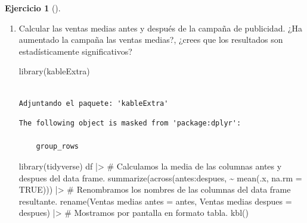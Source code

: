 \documentclass[
  a4paper,
]{scrreport}
\newenvironment{Shaded}{\begin{snugshade}}{\end{snugshade}}
\newcommand{\AttributeTok}[1]{\textcolor[rgb]{0.40,0.45,0.13}{#1}}
\newcommand{\CommentTok}[1]{\textcolor[rgb]{0.37,0.37,0.37}{#1}}
\newcommand{\ConstantTok}[1]{\textcolor[rgb]{0.56,0.35,0.01}{#1}}
\newcommand{\FunctionTok}[1]{\textcolor[rgb]{0.28,0.35,0.67}{#1}}
\newcommand{\NormalTok}[1]{\textcolor[rgb]{0.00,0.23,0.31}{#1}}
\newcommand{\OtherTok}[1]{\textcolor[rgb]{0.00,0.23,0.31}{#1}}
\newcommand{\SpecialCharTok}[1]{\textcolor[rgb]{0.37,0.37,0.37}{#1}}
\newcommand{\StringTok}[1]{\textcolor[rgb]{0.13,0.47,0.30}{#1}}
\theoremstyle{definition}
\newtheorem{exercise}{Ejercicio}[chapter]
\theoremstyle{remark}
\begin{document}
\begin{exercise}[]
\begin{enumerate}
\begin{tcolorbox}
  \end{tcolorbox}
\item
  Calcular las ventas medias antes y después de la campaña de
  publicidad. ¿Ha aumentado la campaña las ventas medias?, ¿crees que
  los resultados son estadísticamente significativos?

  \begin{tcolorbox}[enhanced jigsaw, breakable, toptitle=1mm, colbacktitle=quarto-callout-tip-color!10!white, rightrule=.15mm, opacityback=0, opacitybacktitle=0.6, titlerule=0mm, coltitle=black, colframe=quarto-callout-tip-color-frame, colback=white, bottomtitle=1mm, leftrule=.75mm, toprule=.15mm, title=\textcolor{quarto-callout-tip-color}{\faLightbulb}\hspace{0.5em}{Solución}, arc=.35mm, bottomrule=.15mm, left=2mm]

\begin{Shaded}
\begin{Highlighting}[]
\FunctionTok{library}\NormalTok{(kableExtra)}
\end{Highlighting}
\end{Shaded}

\begin{verbatim}

Adjuntando el paquete: 'kableExtra'
\end{verbatim}

\begin{verbatim}
The following object is masked from 'package:dplyr':

    group_rows
\end{verbatim}

\begin{Shaded}
\begin{Highlighting}[]
\FunctionTok{library}\NormalTok{(tidyverse)}
\NormalTok{df }\SpecialCharTok{|\textgreater{}} 
    \CommentTok{\# Calculamos la media de las columnas antes y despues del data frame.}
    \FunctionTok{summarize}\NormalTok{(}\FunctionTok{across}\NormalTok{(antes}\SpecialCharTok{:}\NormalTok{despues, }\SpecialCharTok{\textasciitilde{}} \FunctionTok{mean}\NormalTok{(.x, }\AttributeTok{na.rm =} \ConstantTok{TRUE}\NormalTok{))) }\SpecialCharTok{|\textgreater{}} 
    \CommentTok{\# Renombramos los nombres de las columnas del data frame resultante.}
    \FunctionTok{rename}\NormalTok{(}\StringTok{\textasciigrave{}}\AttributeTok{Ventas medias antes}\StringTok{\textasciigrave{}} \OtherTok{=}\NormalTok{ antes, }\StringTok{\textasciigrave{}}\AttributeTok{Ventas medias despues}\StringTok{\textasciigrave{}} \OtherTok{=}\NormalTok{ despues) }\SpecialCharTok{|\textgreater{}} 
    \CommentTok{\# Mostramos por pantalla en formato tabla.}
    \FunctionTok{kbl}\NormalTok{()}
\end{Highlighting}
\end{Shaded}


\end{tcolorbox}
\end{enumerate}
\end{exercise}
\end{document}
